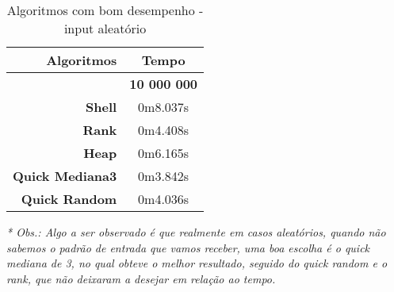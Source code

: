 \documentclass[
	12pt,				%
	oneside,			%
	a4paper,			%
	english,			%
	brazil,				%
	]{article}
\begin{document}
\begin{table}[H]
\centering
\begin{tabular}{|r|c|}
\cline{1-2} 
  \textbf{Algoritmos} & \textbf{Tempo}  \\
 \hline
 \textbf{} & \textbf{10 000 000} \\
 \hline
 \textbf{Shell} & 0m8.037s \\
 \hline
 \textbf{Rank} & 0m4.408s  \\
 \hline
 \textbf{Heap} & 0m6.165s \\
 \hline
 \textbf{Quick Mediana3} & 0m3.842s  \\
 \hline
 \textbf{Quick Random} & 0m4.036s  \\
 \hline
\end{tabular} 
\caption{Algoritmos com bom desempenho - input aleat{\'o}rio}
\end{table}
\textit{* Obs.: Algo a ser observado é que realmente em casos aleatórios, quando não sabemos o padrão de entrada que vamos receber, uma boa escolha é o quick mediana de 3, no
qual obteve o melhor resultado, seguido do quick random e o rank, que não deixaram a desejar em relação ao tempo.}
\clearpage

\end{document}
